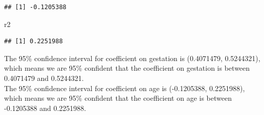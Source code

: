 \documentclass[]{article}
\newenvironment{Shaded}{\begin{snugshade}}{\end{snugshade}}
\newcommand{\NormalTok}[1]{#1}
\begin{document}
\begin{verbatim}
## [1] -0.1205388
\end{verbatim}

\begin{Shaded}
\begin{Highlighting}[]
\NormalTok{r2}
\end{Highlighting}
\end{Shaded}

\begin{verbatim}
## [1] 0.2251988
\end{verbatim}

The 95\% confidence interval for coefficient on gestation is (0.4071479,
0.5244321), which means we are 95\% confident that the coefficient on
gestation is between 0.4071479 and 0.5244321.\\
The 95\% confidence interval for coefficient on age is (-0.1205388,
0.2251988), which means we are 95\% confident that the coefficient on
age is between -0.1205388 and 0.2251988.
\end{document}
